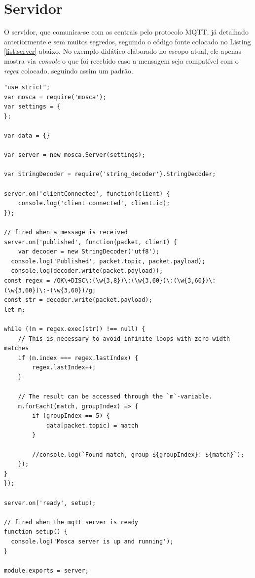 \documentclass[
	12pt,				%
	openright,			%
	twoside,			%
	a4paper,			%
	english,			%
	french,				%
	spanish,			%
	brazil				%
	]{abntex2}
\begin{document}
\newpage

\section{Servidor}

O servidor, que comunica-se com as centrais pelo protocolo MQTT, já detalhado anteriormente e sem muitos segredos, seguindo o código fonte colocado no Listing \ref{list:server} abaixo. No exemplo didático elaborado no escopo atual, ele apenas mostra via \textit{console} o que foi recebido caso a mensagem seja compatível com o \textit{regex} colocado, seguindo assim um padrão.

\begin{lstlisting}[label={list:server},caption=Código-Fonte rodando no servidor.]
"use strict";
var mosca = require('mosca');
var settings = {
};

var data = {}

var server = new mosca.Server(settings);

var StringDecoder = require('string_decoder').StringDecoder;

server.on('clientConnected', function(client) {
    console.log('client connected', client.id);
});

// fired when a message is received
server.on('published', function(packet, client) {
    var decoder = new StringDecoder('utf8');
  console.log('Published', packet.topic, packet.payload);
  console.log(decoder.write(packet.payload));
const regex = /OK\+DISC\:(\w{3,8})\:(\w{3,60})\:(\w{3,60})\:(\w{3,60})\:-(\w{3,60})/g;
const str = decoder.write(packet.payload);
let m;

while ((m = regex.exec(str)) !== null) {
    // This is necessary to avoid infinite loops with zero-width matches
    if (m.index === regex.lastIndex) {
        regex.lastIndex++;
    }

    // The result can be accessed through the `m`-variable.
    m.forEach((match, groupIndex) => {
        if (groupIndex == 5) {
            data[packet.topic] = match
        }

        //console.log(`Found match, group ${groupIndex}: ${match}`);
    });
}
});

server.on('ready', setup);

// fired when the mqtt server is ready
function setup() {
  console.log('Mosca server is up and running');
}

module.exports = server;
\end{lstlisting}
\end{document}
